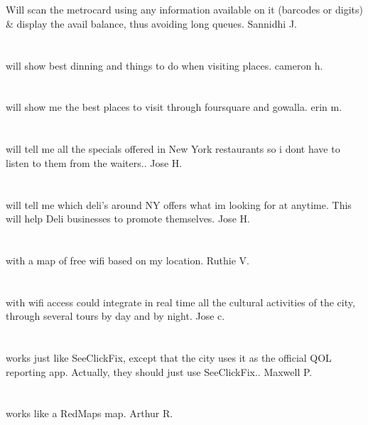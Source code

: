\section{}Will scan the metrocard using any information available on it (barcodes or digits) \& display the avail balance,  thus avoiding long queues. Sannidhi J.
\section{} will show best dinning and things to do when visiting places. cameron h.
\section{} will show me the best places to visit through foursquare and gowalla. erin m.
\section{}will tell me all the specials offered in New York restaurants so i dont have to listen to them from the waiters.. Jose H.
\section{}will tell me which deli's around NY offers what im looking for at anytime. This will help Deli businesses to promote themselves. Jose H.
\section{}with a map of free wifi based on my location. Ruthie V.
\section{}with wifi access could integrate in real time all the cultural activities of the city,  through several tours by day and by night. Jose c.
\section{}works just like SeeClickFix,  except that the city uses it as the official QOL reporting app.  Actually,  they should just use SeeClickFix.. Maxwell P.
\section{}works like a RedMaps map. Arthur R.
